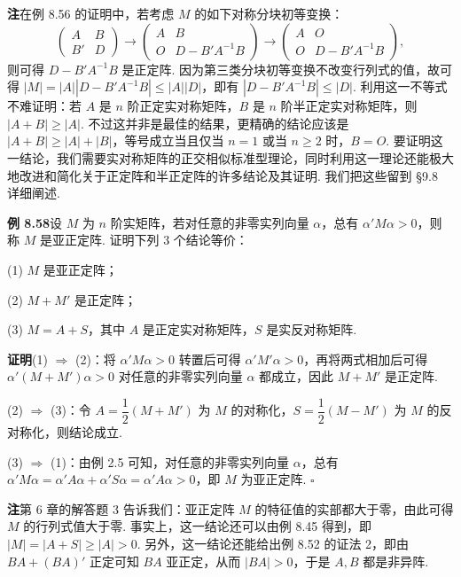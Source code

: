 \documentclass[UTF8, 12pt, fontset=fandol, oneside]{ctexart}
\begin{document}
\noindent\textbf{注}\quad 在例 8.56 的证明中，若考虑 $M$ 的如下对称分块初等变换：
\[
\left(\begin{array}{cc}
A & B\\
B' & D
\end{array}\right)
\to
\left(\begin{array}{cc}
A & B\\
O & D-B'A^{-1}B
\end{array}\right)
\to
\left(\begin{array}{cc}
A & O\\
O & D-B'A^{-1}B
\end{array}\right),
\]
则可得 $D-B'A^{-1}B$ 是正定阵. 因为第三类分块初等变换不改变行列式的值，故可得 $|M|=|A||D-B'A^{-1}B|\le |A||D|$，即有 $|D-B'A^{-1}B|\le |D|$. 利用这一不等式不难证明：若 $A$ 是 $n$ 阶正定实对称矩阵，$B$ 是 $n$ 阶半正定实对称矩阵，则 $|A+B|\ge |A|$. 不过这并非是最佳的结果，更精确的结论应该是 $|A+B|\ge |A|+|B|$，等号成立当且仅当 $n=1$ 或当 $n\ge 2$ 时，$B=O$. 要证明这一结论，我们需要实对称矩阵的正交相似标准型理论，同时利用这一理论还能极大地改进和简化关于正定阵和半正定阵的许多结论及其证明. 我们把这些留到 §9.8 详细阐述.

\noindent\textbf{例 8.58}\quad 设 $M$ 为 $n$ 阶实矩阵，若对任意的非零实列向量 $\alpha$，总有 $\alpha'M\alpha>0$，则称 $M$ 是亚正定阵. 证明下列 3 个结论等价：

(1) $M$ 是亚正定阵；

(2) $M+M'$ 是正定阵；

(3) $M=A+S$，其中 $A$ 是正定实对称矩阵，$S$ 是实反对称矩阵.

\noindent\textbf{证明}\quad (1) $\Rightarrow$ (2)：将 $\alpha'M\alpha>0$ 转置后可得 $\alpha'M'\alpha>0$，再将两式相加后可得 $\alpha'(M+M')\alpha>0$ 对任意的非零实列向量 $\alpha$ 都成立，因此 $M+M'$ 是正定阵.

(2) $\Rightarrow$ (3)：令 $A=\dfrac12(M+M')$ 为 $M$ 的对称化，$S=\dfrac12(M-M')$ 为 $M$ 的反对称化，则结论成立.

(3) $\Rightarrow$ (1)：由例 2.5 可知，对任意的非零实列向量 $\alpha$，总有 $\alpha'M\alpha=\alpha'A\alpha+\alpha'S\alpha=\alpha'A\alpha>0$，即 $M$ 为亚正定阵. $\ensuremath{\square}$

\noindent\textbf{注}\quad 第 6 章的解答题 3 告诉我们：亚正定阵 $M$ 的特征值的实部都大于零，由此可得 $M$ 的行列式值大于零. 事实上，这一结论还可以由例 8.45 得到，即 $|M|=|A+S|\ge |A|>0$. 另外，这一结论还能给出例 8.52 的证法 2，即由 $BA+(BA)'$ 正定可知 $BA$ 亚正定，从而 $|BA|>0$，于是 $A,B$ 都是非异阵.
\end{document}
